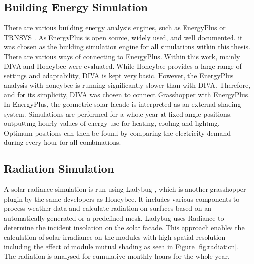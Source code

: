 
		
		\subsection{Building Energy Simulation}

			There are various building energy analysis engines, such as EnergyPlus \cite{energyplus} or TRNSYS \cite{trnsys}. As EnergyPlus is open source, widely used, and well documented, it was chosen as the building simulation engine for all simulations within this thesis. There are various ways of connecting to EnergyPlus. Within this work, mainly DIVA \cite{DIVA} and Honeybee\cite{roudsari2014ladybug} were evaluated. While Honeybee provides a large range of settings and adaptability, DIVA is kept very basic. However, the EnergyPlus analysis with honeybee is running significantly slower than with DIVA. Therefore, and for its simplicity, DIVA was chosen to connect Grasshopper with EnergyPlus. In EnergyPlus, the geometric solar facade is interpreted as an external shading system. Simulations are performed for a whole year at fixed angle positions, outputting hourly values of energy use for heating, cooling and lighting. Optimum positions can then be found by comparing the electricity demand during every hour for all combinations. 

		\subsection{Radiation Simulation} 

			A solar radiance simulation is run using Ladybug \cite{roudsari2014ladybug}, which is another grasshopper plugin by the same developers as Honeybee. It includes various components to process weather data and calculate radiation on surfaces based on an automatically generated or a predefined mesh. Ladybug uses Radiance \cite{ward1994radiance} to determine the incident insolation on the solar facade. This approach enables the calculation of solar irradiance on the modules with high spatial resolution including the effect of module mutual shading as seen in Figure \ref{fig:radiation}. The radiation is analysed for cumulative monthly hours for the whole year. 

